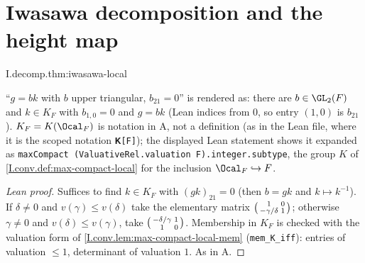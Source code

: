 \section{Iwasawa decomposition and the height map}
\begin{theorem}
\end{theorem}
\begin{tfformal}{I.decomp.thm:iwasawa-local}
\begin{tffidelity}
``$g=bk$ with $b$ upper triangular, $b_{21}=0$'' is rendered as: there are $b\in\GL_2(F)$ and $k\in K_F$ with $b_{1,0}=0$ and $g=bk$ (Lean indices from $0$, so entry $(1,0)$ is $b_{21}$). $K_F=K(\Ocal_F)$ is notation in A, not a definition (as in the Lean file, where it is the scoped notation \texttt{𝐊[F]}); the displayed Lean statement shows it expanded as \texttt{maxCompact (ValuativeRel.valuation F).integer.subtype}, the group $K$ of \cref{I.conv.def:max-compact-local} for the inclusion $\Ocal_F\hookrightarrow F$.
\end{tffidelity}
\end{tfformal}
\begin{proof}[Lean proof]
Suffices to find $k\in K_F$ with $(gk)_{21}=0$ (then $b=gk$ and $k\mapsto k^{-1}$). If $\delta\neq0$ and $v(\gamma)\le v(\delta)$ take the elementary matrix $\begin{psmallmatrix}1&0\\-\gamma/\delta&1\end{psmallmatrix}$; otherwise $\gamma\neq0$ and $v(\delta)\le v(\gamma)$, take $\begin{psmallmatrix}-\delta/\gamma&1\\1&0\end{psmallmatrix}$. Membership in $K_F$ is checked with the valuation form of \cref{I.conv.lem:max-compact-local-mem} (\texttt{mem\_K\_iff}): entries of valuation $\le1$, determinant of valuation $1$. As in A.
\end{proof}

